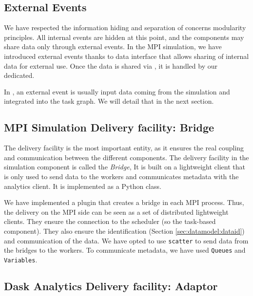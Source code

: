 

\subsection{External Events}

We have respected the information hiding and separation of concerns modularity principles. All internal events are hidden at this point, and the components may share data only through external events. 
In the MPI simulation, we have introduced external events thanks to \pdi data interface that allows sharing of internal data for external use. Once the data is shared via \pdi, it is handled by our dedicated.

In \dask,  an external event is usually input data coming from the simulation and integrated into the task graph. We will detail that in the next section.   

\subsection{MPI Simulation Delivery facility: Bridge}\label{sec:bridge}
The delivery facility is the most important entity, as it ensures the real coupling and communication between the different components.
The delivery facility in the simulation component is called the \textit{Bridge}, 
It is built on a lightweight \dask client that is only used to send data to the workers and communicates metadata with the analytics client. It is implemented as a Python class.

We have implemented a \pdi plugin that creates a bridge in each MPI process. Thus,  the delivery on the MPI side can be seen as a set of distributed lightweight \dask clients. They ensure the connection to the \dask scheduler (so the task-based component). They also ensure the identification (Section \ref{sec:datamodel:dataid}) and communication of the data. 
We have opted to use \texttt{scatter} to send data from the  bridges to the \dask workers. To communicate metadata, we have used \dask \texttt{Queues} and \texttt{Variables}.


\subsection{Dask Analytics Delivery facility: Adaptor}\label{sec:adaptor}

